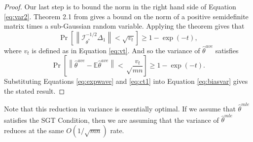 \documentclass[twoside]{article}
\DeclareMathOperator*{\tr}{tr}
\newcommand{\zero}{\text{\textbf{0}}}
\newcommand{\E}{\mathbb{E}}
\newcommand{\w}{\theta}
\newcommand{\wave}{\hat\w^{ave}}
\newcommand{\wtave}{\E\hat\w^{ave}}
\newcommand{\wmle}{\hat\w^{mle}}
\newcommand{\wstar}{{\w^{*}}}
\newcommand{\I}{\mathcal I}
\newcommand{\normal}[2]{\ensuremath{\mathcal{N}\left({{#1}},{{#2}}\right)}}
\newcommand{\ltwo}[1]{{\lVert {#1} \rVert}}
\newcommand{\ltwobig}[1]{{\left\lVert {#1} \right\rVert}}
\newcommand{\prob}[1]{\Pr\left[{#1}\right]}
\begin{document}
\begin{proof}
Our last step is to bound the norm in the right hand side of Equation \ref{eq:var2}.
Theorem 2.1 from \cite{hsu2012tail} gives a bound on the norm of a positive semidefinite matrix times a sub-Gaussian random variable.
Applying the theorem gives that %
\begin{equation}
\prob{
    \ltwobig{\I^{-1/2}_\wstar\Delta_1} < \sqrt{v_t}
}
\ge 1-\exp(-t)
,
\end{equation}
where $v_t$ is defined as in Equation \ref{eq:vt}.
And so the variance of $\wave$ satisfies
\begin{equation}
\prob{
\ltwobig{\wave-\E\wave}
<
\sqrt\frac{v_t}{{mn}}
}
\ge 1-\exp(-t)
.
\label{eq:ct1}
\end{equation}
Substituting Equations \ref{eq:expwave} and \ref{eq:ct1} into Equation \ref{eq:biasvar} gives the stated result.
\end{proof}

Note that this reduction in variance is essentially optimal.
If we assume that $\wmle$ satisfies the SGT Condition,
then we are assuming that the variance of $\wmle$ reduces at the same $O(1/\sqrt{mn})$ rate.
\end{document}
